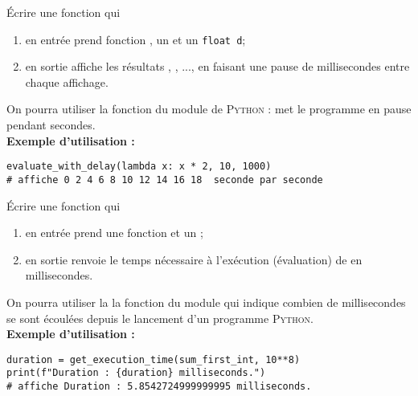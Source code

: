 \documentclass[a4paper,12pt,french]{article}
\begin{document}
\begin{exercice}[]
	\'Ecrire une fonction  qui 
	\begin{enumerate}[--]
		\item 	en entrée prend fonction , un  et un \texttt{float d}; 
		\item 	en sortie affiche les résultats , , ...,  en faisant une pause de  millisecondes entre chaque affichage.
	\end{enumerate}
On pourra utiliser la fonction  du module  de \textsc{Python} :  met le programme en pause pendant  secondes.\\
\textbf{Exemple d'utilisation :}
\begin{verbatim}
evaluate_with_delay(lambda x: x * 2, 10, 1000) 
# affiche 0 2 4 6 8 10 12 14 16 18  seconde par seconde
\end{verbatim}
\end{exercice}

\begin{exercice}
	\'Ecrire une fonction  qui
\begin{enumerate}[--]
	\item 	en entrée prend une fonction  et un ;
	\item 	en sortie renvoie le temps nécessaire à l'exécution (évaluation) de  en millisecondes.
\end{enumerate}
On pourra utiliser la la fonction  du module  qui indique combien de millisecondes se sont écoulées depuis le lancement d'un programme \textsc{Python}.\\


\textbf{Exemple d'utilisation :}
\begin{verbatim}
duration = get_execution_time(sum_first_int, 10**8)
print(f"Duration : {duration} milliseconds.")
# affiche Duration : 5.8542724999999995 milliseconds.
\end{verbatim}
\end{exercice}
\end{document}
